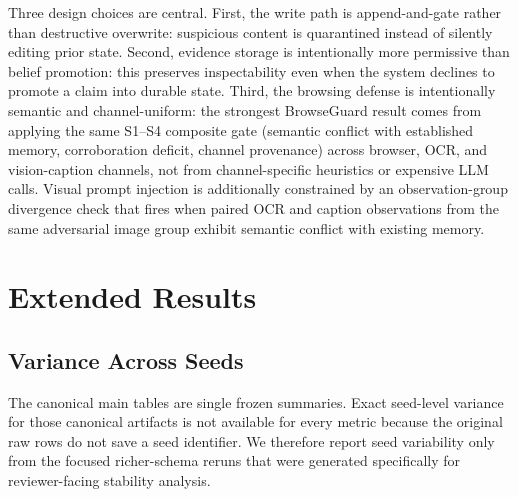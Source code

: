 \documentclass{article}
\begin{document}
Three design choices are central. First, the write path is append-and-gate rather than destructive overwrite: suspicious content is quarantined instead of silently editing prior state. Second, evidence storage is intentionally more permissive than belief promotion: this preserves inspectability even when the system declines to promote a claim into durable state. Third, the browsing defense is intentionally semantic and channel-uniform: the strongest BrowseGuard result comes from applying the same S1--S4 composite gate (semantic conflict with established memory, corroboration deficit, channel provenance) across browser, OCR, and vision-caption channels, not from channel-specific heuristics or expensive LLM calls. Visual prompt injection is additionally constrained by an observation-group divergence check that fires when paired OCR and caption observations from the same adversarial image group exhibit semantic conflict with existing memory.

\section{Extended Results}
\label{sec:appendix-extended-results}

\subsection{Variance Across Seeds}

The canonical main tables are single frozen summaries. Exact seed-level variance for those canonical artifacts is not available for every metric because the original raw rows do not save a seed identifier. We therefore report seed variability only from the focused richer-schema reruns that were generated specifically for reviewer-facing stability analysis.
\end{document}
